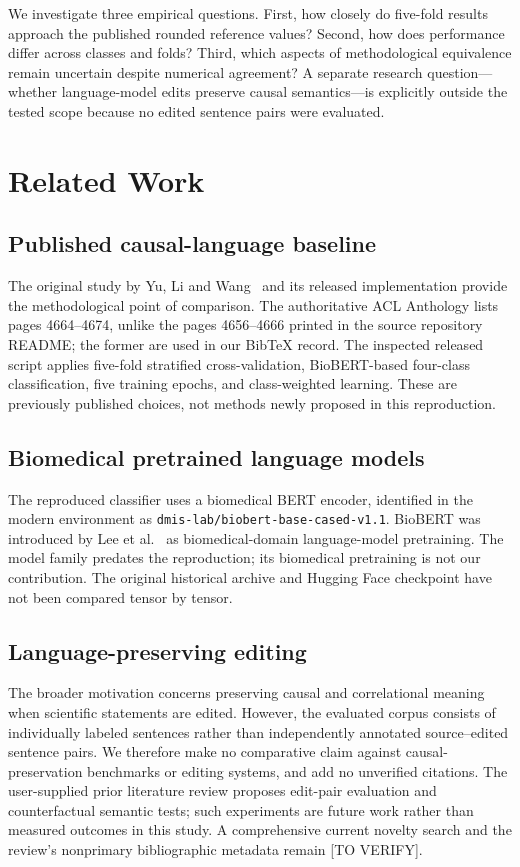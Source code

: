 \documentclass[conference]{IEEEtran}
\begin{document}
We investigate three empirical questions. First, how closely do five-fold results approach the published rounded reference values? Second, how does performance differ across classes and folds? Third, which aspects of methodological equivalence remain uncertain despite numerical agreement? A separate research question---whether language-model edits preserve causal semantics---is explicitly outside the tested scope because no edited sentence pairs were evaluated.

\section{Related Work}\label{sec:related}
\subsection{Published causal-language baseline}
The original study by Yu, Li and Wang~\cite{yu2019detecting} and its released implementation provide the methodological point of comparison. The authoritative ACL Anthology lists pages 4664--4674, unlike the pages 4656--4666 printed in the source repository README; the former are used in our BibTeX record. The inspected released script applies five-fold stratified cross-validation, BioBERT-based four-class classification, five training epochs, and class-weighted learning. These are previously published choices, not methods newly proposed in this reproduction.

\subsection{Biomedical pretrained language models}
The reproduced classifier uses a biomedical BERT encoder, identified in the modern environment as \texttt{dmis-lab/biobert-base-cased-v1.1}. BioBERT was introduced by Lee et al.~\cite{lee2020biobert} as biomedical-domain language-model pretraining. The model family predates the reproduction; its biomedical pretraining is not our contribution. The original historical archive and Hugging Face checkpoint have not been compared tensor by tensor.

\subsection{Language-preserving editing}
The broader motivation concerns preserving causal and correlational meaning when scientific statements are edited. However, the evaluated corpus consists of individually labeled sentences rather than independently annotated source--edited sentence pairs. We therefore make no comparative claim against causal-preservation benchmarks or editing systems, and add no unverified citations. The user-supplied prior literature review proposes edit-pair evaluation and counterfactual semantic tests; such experiments are future work rather than measured outcomes in this study. A comprehensive current novelty search and the review's nonprimary bibliographic metadata remain [TO VERIFY].
\end{document}
